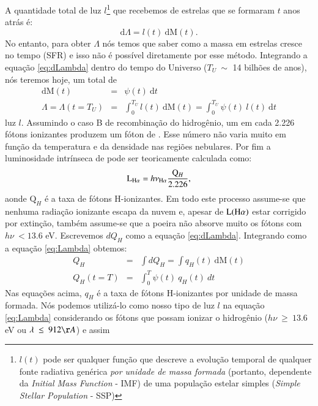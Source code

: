 A quantidade total de luz $l$\footnote{$l(t)$ pode ser qualquer função que descreve a evolução
temporal de qualquer fonte radiativa genérica \emph{por unidade de massa formada} (portanto,
dependente da {\em Initial Mass Function} - IMF) de uma população estelar simples ({\em Simple
Stellar Population} - SSP)} que recebemos de estrelas que se formaram $t$ anos atrás é:
\begin{equation}
	\mathrm{d}\Lambda = l(t)\ \mathrm{d}\mathrm{M}(t).
	\label{eq:dLambda}
\end{equation}
\noindent No entanto, para obter $\Lambda$ nós temos que saber como a massa em estrelas cresce no
tempo (SFR) e isso não é possível diretamente por esse método. Integrando a equação
\eqref{eq:dLambda} dentro do tempo do Universo ($T_U\ \sim$ 14 bilhões de anos), nós teremos hoje,
um total de
\begin{eqnarray}
	\mathrm{d}\mathrm{M}(t) &=& \psi(t)\ \mathrm{d}t \\
	\Lambda = \Lambda(t = T_U) &=& \int_0^{T_U} l(t)\ \textrm{d}\textrm{M}(t) = \int_0^{T_U} \psi(t)\
	l(t)\ \textrm{d}t
	\label{eq:Lambda}
\end{eqnarray}
\noindent luz $l$. Assumindo o caso B de recombinação do hidrogênio, um em cada 2.226 fótons
ionizantes produzem um fóton de \Halpha \citep{Osterbrock.Ferland.2006a}. Esse número não varia
muito em função da temperatura e da densidade nas regiões nebulares. Por fim a luminosidade
intrínseca de \Halpha pode ser teoricamente calculada como:
\begin{equation}
	\LHalpha = h \nu_{\Halpha} \frac{\mathrm{Q}_H}{2.226},
	\label{eq:LHa_recomb_theory}
\end{equation}
\noindent aonde $\mathrm{Q}_H$ é a taxa de fótons H-ionizantes. Em todo este processo
assume-se que nenhuma radiação ionizante escapa da nuvem e, apesar de $\mathrm{L}(\Halpha)$ estar
corrigido por extinção, também assume-se que a poeira não absorve muito os fótons com $h\nu\ < 13.6$
eV. Escrevemos $dQ_H$ como a equação \eqref{eq:dLambda}. Integrando como a equação \eqref{eq:Lambda}
obtemos:
\begin{eqnarray}
	Q_H &=& \int dQ_H = \int q_H(t)\ \mathrm{d}\mathrm{M}(t) \\ 
	Q_H(t = T) &=& \int_0^T \psi(t)\ q_H(t)\ dt
	\label{eq:QH}
\end{eqnarray}
\noindent Nas equações acima, $q_H$ é a taxa de fótons H-ionizantes por unidade de massa formada.
Nós podemos utilizá-lo como nosso tipo de luz $l$ na equação \eqref{eq:Lambda} considerando os
fótons que possam ionizar o hidrogênio ($h\nu\ \geq\ 13.6$ eV ou $\lambda\ \leq\ 912\AA$) e assim
